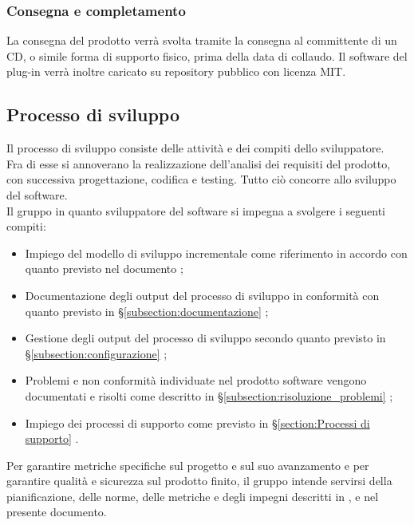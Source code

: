 \subsubsection{Consegna e completamento}
La consegna del prodotto \projectName{} verrà svolta tramite la consegna al committente di un CD, o simile forma di supporto fisico, prima della data di collaudo. Il software del plug-in verrà inoltre caricato su repository pubblico con licenza MIT.

\subsection{Processo di sviluppo}
Il processo di sviluppo consiste delle attività e dei compiti dello sviluppatore.\\
Fra di esse si annoverano la realizzazione dell'analisi dei requisiti del prodotto, con successiva progettazione, codifica e testing. Tutto ciò concorre allo sviluppo del software.\\
Il gruppo \groupName{} in quanto sviluppatore del software \projectName{} si impegna a svolgere i seguenti compiti:
\begin{itemize}
	\item Impiego del modello di sviluppo incrementale come riferimento in accordo con quanto previsto nel documento \docNameVersionPdP{};
	\item Documentazione degli output del processo di sviluppo in conformità con quanto previsto in §\ref{subsection:documentazione} ;
	\item Gestione degli output del processo di sviluppo secondo quanto previsto in §\ref{subsection:configurazione} ;
	\item Problemi e non conformità individuate nel prodotto software vengono documentati e risolti come descritto in §\ref{subsection:risoluzione_problemi} ;
	\item Impiego dei processi di supporto come previsto in §\ref{section:Processi di supporto} .
\end{itemize}
Per garantire metriche specifiche sul progetto e sul suo avanzamento e per garantire qualità e sicurezza sul prodotto finito, il gruppo \groupName{} intende servirsi della pianificazione, delle norme, delle metriche e degli impegni descritti in \docNameVersionPdP{}, \docNameVersionPdQ{} e nel presente documento.


